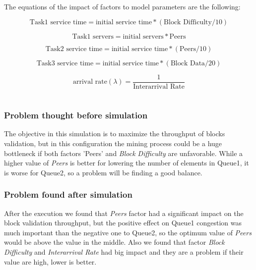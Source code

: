 \documentclass[12pt,a4paper]{article}
\begin{document}
	The equations of the impact of factors to model parameters are the following:
	
	\begin{equation}
		\text{Task1 service time} = \text{initial service time} * (\text{Block Difficulty} / 10)
		\label{eq:service time task1}
	\end{equation}
	
	\begin{equation}
		\text{Task1 servers} = \text{initial servers} * \text{Peers}
		\label{eq:servers task1}
	\end{equation}
	
	\begin{equation}
		\text{Task2 service time} = \text{initial service time} * (\text{Peers} / 10)
		\label{eq:service time task2}
	\end{equation}
	
	\begin{equation}
		\text{Task3 service time} = \text{initial service time} * (\text{Block Data} / 20)
		\label{eq:service time task3}
	\end{equation}
	
	\begin{equation}
		\text{arrival rate}(\lambda) = \frac{1}{\text{Interarrival Rate}}
		\label{eq:arrival rate}
	\end{equation}\\
	
	\subsubsection*{Problem thought before simulation}
	\noindent The objective in this simulation is to maximize the throughput of blocks validation, but in this configuration the mining process could be a huge bottleneck if both factors 'Peers' and \textit{Block Difficulty} are unfavorable. While a higher value of \textit{Peers} is better for lowering the number of elements in Queue1, it is worse for Queue2, so a problem will be finding a good balance.
	
	\subsubsection*{Problem found after simulation}
	After the execution we found that \textit{Peers} factor had a significant impact on the block validation throughput, but the positive effect on Queue1 congestion was much important than the negative one to Queue2, so the optimum value of \textit{Peers} would be above the value in the middle. Also we found that factor \textit{Block Difficulty} and \textit{Interarrival Rate} had big impact and they are a problem if their value are high, lower is better.
	
\end{document}
